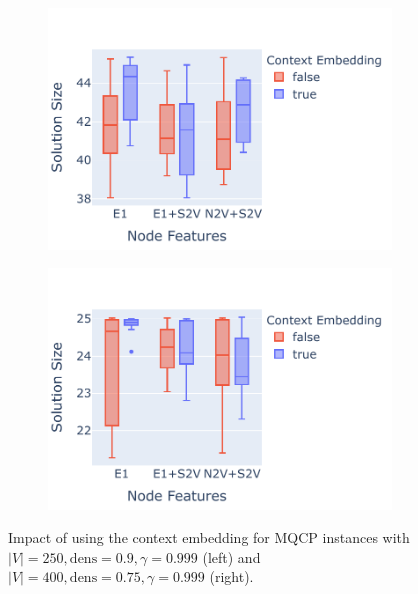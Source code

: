 \documentclass[draft,final]{vutinfth} %
\begin{document}
\begin{figure}
    \centering
    \begin{subfigure}{0.49\textwidth}
        \centering
        \includegraphics[width=\textwidth]{graphics/context-1.pdf}
    \end{subfigure}
    \begin{subfigure}{0.49\textwidth}
        \centering
        \includegraphics[width=\textwidth]{graphics/context-2.pdf}
    \end{subfigure}
    \caption{Impact of using the context embedding for MQCP instances with $|V|=250, \mathrm{dens}=0.9, \gamma=0.999$ (left) and $|V|=400, \mathrm{dens}=0.75, \gamma=0.999$ (right). }
    \label{fig:context-embedding}
\end{figure}
\end{document}
